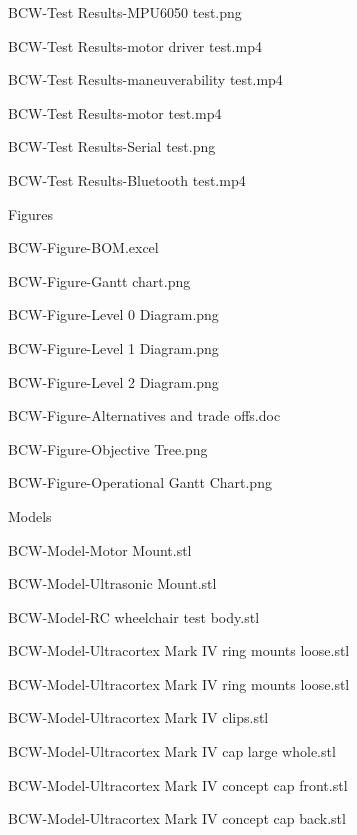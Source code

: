 \documentclass[conference]{IEEEtran}
\begin{document}
          \indent\indent\indent\indent  BCW-Test Results-MPU6050 test.png 
            
           \indent\indent\indent\indent BCW-Test Results-motor driver test.mp4 
            
          \indent\indent\indent\indent  BCW-Test Results-maneuverability test.mp4

    \indent BCW-Test Results-motor test.mp4 

    \indent BCW-Test Results-Serial test.png 
    
    \indent BCW-Test Results-Bluetooth test.mp4 
    
    \indent Figures 
    
        \indent \indent BCW-Figure-BOM.excel 
        
        \indent \indent BCW-Figure-Gantt chart.png 
        
        \indent \indent BCW-Figure-Level 0 Diagram.png 
        
        \indent \indent BCW-Figure-Level 1 Diagram.png 
        
       \indent \indent  BCW-Figure-Level 2 Diagram.png 
        
       \indent \indent  BCW-Figure-Alternatives and trade offs.doc 
        
       \indent \indent  BCW-Figure-Objective Tree.png 
        
       \indent \indent  BCW-Figure-Operational Gantt Chart.png 
        
    \indent Models 
    
        \indent \indent BCW-Model-Motor Mount.stl 
        
        \indent \indent BCW-Model-Ultrasonic Mount.stl 
        
       \indent \indent  BCW-Model-RC wheelchair test body.stl 
        
       \indent \indent  BCW-Model-Ultracortex Mark IV ring mounts loose.stl 
        
        \indent \indent BCW-Model-Ultracortex Mark IV ring mounts loose.stl 
        
       \indent \indent BCW-Model-Ultracortex Mark IV clips.stl 
        
       \indent \indent  BCW-Model-Ultracortex Mark IV cap large whole.stl 
        
        \indent \indent BCW-Model-Ultracortex Mark IV concept cap front.stl 
        
        \indent \indent BCW-Model-Ultracortex Mark IV concept cap back.stl 
        
\end{document}
